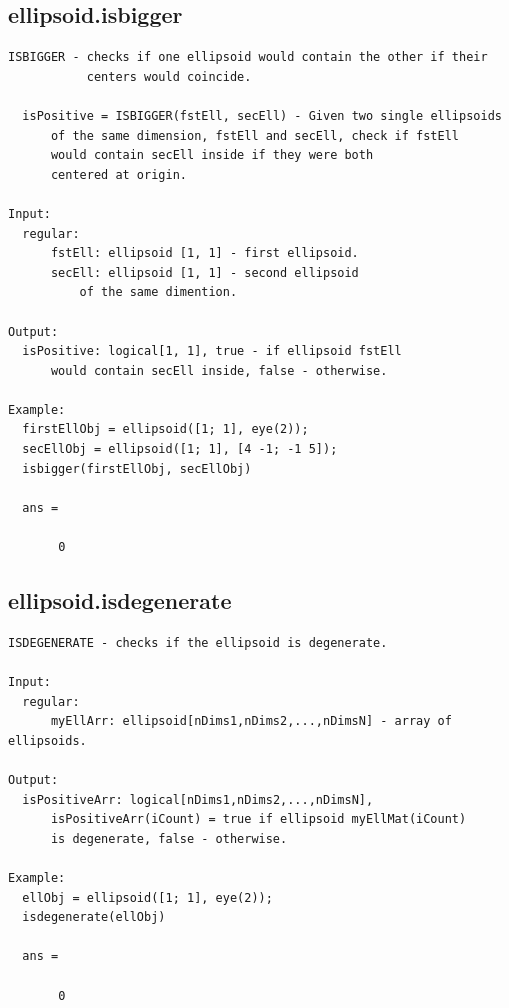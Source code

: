 \documentclass[letterpaper,10pt,english]{sphinxmanual}
\begin{document}
\subsection{ellipsoid.isbigger}
\label{chap_functions:ellipsoid-isbigger}
\begin{Verbatim}[commandchars=\\\{\}]
ISBIGGER - checks if one ellipsoid would contain the other if their
           centers would coincide.

  isPositive = ISBIGGER(fstEll, secEll) - Given two single ellipsoids
      of the same dimension, fstEll and secEll, check if fstEll
      would contain secEll inside if they were both
      centered at origin.

Input:
  regular:
      fstEll: ellipsoid [1, 1] - first ellipsoid.
      secEll: ellipsoid [1, 1] - second ellipsoid
          of the same dimention.

Output:
  isPositive: logical[1, 1], true - if ellipsoid fstEll
      would contain secEll inside, false - otherwise.

Example:
  firstEllObj = ellipsoid([1; 1], eye(2));
  secEllObj = ellipsoid([1; 1], [4 -1; -1 5]);
  isbigger(firstEllObj, secEllObj)

  ans =

       0
\end{Verbatim}


\subsection{ellipsoid.isdegenerate}
\label{chap_functions:ellipsoid-isdegenerate}
\begin{Verbatim}[commandchars=\\\{\}]
ISDEGENERATE - checks if the ellipsoid is degenerate.

Input:
  regular:
      myEllArr: ellipsoid[nDims1,nDims2,...,nDimsN] - array of ellipsoids.

Output:
  isPositiveArr: logical[nDims1,nDims2,...,nDimsN],
      isPositiveArr(iCount) = true if ellipsoid myEllMat(iCount)
      is degenerate, false - otherwise.

Example:
  ellObj = ellipsoid([1; 1], eye(2));
  isdegenerate(ellObj)

  ans =

       0
\end{Verbatim}
\end{document}
